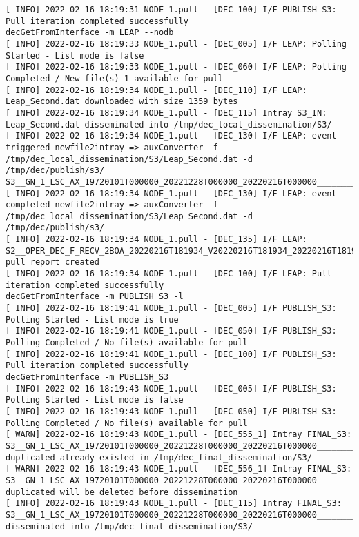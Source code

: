 \documentclass[dec_sum_main.tex]{subfiles}
\begin{document}
\begin{Verbatim}[fontsize=\tiny]
[ INFO] 2022-02-16 18:19:31 NODE_1.pull - [DEC_100] I/F PUBLISH_S3: Pull iteration completed successfully
decGetFromInterface -m LEAP --nodb
[ INFO] 2022-02-16 18:19:33 NODE_1.pull - [DEC_005] I/F LEAP: Polling Started - List mode is false
[ INFO] 2022-02-16 18:19:33 NODE_1.pull - [DEC_060] I/F LEAP: Polling Completed / New file(s) 1 available for pull
[ INFO] 2022-02-16 18:19:34 NODE_1.pull - [DEC_110] I/F LEAP: Leap_Second.dat downloaded with size 1359 bytes
[ INFO] 2022-02-16 18:19:34 NODE_1.pull - [DEC_115] Intray S3_IN: Leap_Second.dat disseminated into /tmp/dec_local_dissemination/S3/
[ INFO] 2022-02-16 18:19:34 NODE_1.pull - [DEC_130] I/F LEAP: event triggered newfile2intray => auxConverter -f /tmp/dec_local_dissemination/S3/Leap_Second.dat -d /tmp/dec/publish/s3/
S3__GN_1_LSC_AX_19720101T000000_20221228T000000_20220216T000000_____________________USN_O_NR_POD.SEN3
[ INFO] 2022-02-16 18:19:34 NODE_1.pull - [DEC_130] I/F LEAP: event completed newfile2intray => auxConverter -f /tmp/dec_local_dissemination/S3/Leap_Second.dat -d /tmp/dec/publish/s3/
[ INFO] 2022-02-16 18:19:34 NODE_1.pull - [DEC_135] I/F LEAP: S2__OPER_DEC_F_RECV_2BOA_20220216T181934_V20220216T181934_20220216T181934_LEAP.xml pull report created
[ INFO] 2022-02-16 18:19:34 NODE_1.pull - [DEC_100] I/F LEAP: Pull iteration completed successfully
decGetFromInterface -m PUBLISH_S3 -l
[ INFO] 2022-02-16 18:19:41 NODE_1.pull - [DEC_005] I/F PUBLISH_S3: Polling Started - List mode is true
[ INFO] 2022-02-16 18:19:41 NODE_1.pull - [DEC_050] I/F PUBLISH_S3: Polling Completed / No file(s) available for pull
[ INFO] 2022-02-16 18:19:41 NODE_1.pull - [DEC_100] I/F PUBLISH_S3: Pull iteration completed successfully
decGetFromInterface -m PUBLISH_S3
[ INFO] 2022-02-16 18:19:43 NODE_1.pull - [DEC_005] I/F PUBLISH_S3: Polling Started - List mode is false
[ INFO] 2022-02-16 18:19:43 NODE_1.pull - [DEC_050] I/F PUBLISH_S3: Polling Completed / No file(s) available for pull
[ WARN] 2022-02-16 18:19:43 NODE_1.pull - [DEC_555_1] Intray FINAL_S3: S3__GN_1_LSC_AX_19720101T000000_20221228T000000_20220216T000000_____________________USN_O_NR_POD.SEN3 duplicated already existed in /tmp/dec_final_dissemination/S3/
[ WARN] 2022-02-16 18:19:43 NODE_1.pull - [DEC_556_1] Intray FINAL_S3: S3__GN_1_LSC_AX_19720101T000000_20221228T000000_20220216T000000_____________________USN_O_NR_POD.SEN3 duplicated will be deleted before dissemination
[ INFO] 2022-02-16 18:19:43 NODE_1.pull - [DEC_115] Intray FINAL_S3: S3__GN_1_LSC_AX_19720101T000000_20221228T000000_20220216T000000_____________________USN_O_NR_POD.SEN3 disseminated into /tmp/dec_final_dissemination/S3/

\end{Verbatim}
\end{document}

